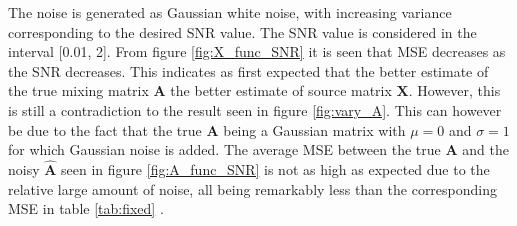 The noise is generated as Gaussian white noise, with increasing variance corresponding to the desired SNR value. 
The SNR value is considered in the interval [0.01, 2]. 
From figure \ref{fig:X_func_SNR} it is seen that MSE decreases as the SNR decreases. 
This indicates as first expected that the better estimate of the true mixing matrix $\mathbf{A}$ the better estimate of source matrix $\mathbf{X}$. 
However, this is still a contradiction to the result seen in figure \ref{fig:vary_A}. 
This can however be due to the fact that the true $\mathbf{A}$ being a Gaussian matrix with $\mu = 0$ and $\sigma = 1$ for which Gaussian noise is added. The average MSE between the true $\mathbf{A}$ and the noisy $\hat{\mathbf{A}}$ seen in figure \ref{fig:A_func_SNR} is not as high as expected due to the relative large amount of noise, all being remarkably less than the corresponding MSE in table \ref{tab:fixed} .  

